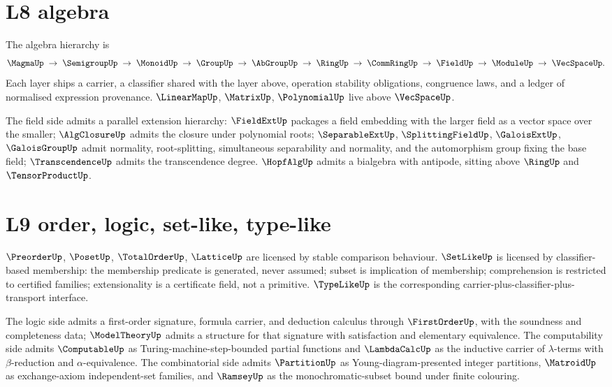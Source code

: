 \section{L8 algebra}
\label{sec:roadmap-l8-algebra}

The algebra hierarchy is
$$
\MagmaUp
\;\to\;
\SemigroupUp
\;\to\;
\MonoidUp
\;\to\;
\GroupUp
\;\to\;
\AbGroupUp
\;\to\;
\RingUp
\;\to\;
\CommRingUp
\;\to\;
\FieldUp
\;\to\;
\ModuleUp
\;\to\;
\VecSpaceUp.
$$
Each layer ships a carrier, a classifier shared with the layer above, operation stability obligations, congruence laws, and a ledger of normalised expression provenance. $\LinearMapUp$, $\MatrixUp$, $\PolynomialUp$ live above $\VecSpaceUp$.

The field side admits a parallel extension hierarchy: $\FieldExtUp$ packages a field embedding with the larger field as a vector space over the smaller; $\AlgClosureUp$ admits the closure under polynomial roots; $\SeparableExtUp$, $\SplittingFieldUp$, $\GaloisExtUp$, $\GaloisGroupUp$ admit normality, root-splitting, simultaneous separability and normality, and the automorphism group fixing the base field; $\TranscendenceUp$ admits the transcendence degree. $\HopfAlgUp$ admits a bialgebra with antipode, sitting above $\RingUp$ and $\TensorProductUp$.

\section{L9 order, logic, set-like, type-like}
\label{sec:roadmap-l9-order-logic-set-type}

$\PreorderUp$, $\PosetUp$, $\TotalOrderUp$, $\LatticeUp$ are licensed by stable comparison behaviour. $\SetLikeUp$ is licensed by classifier-based membership: the membership predicate is generated, never assumed; subset is implication of membership; comprehension is restricted to certified families; extensionality is a certificate field, not a primitive. $\TypeLikeUp$ is the corresponding carrier-plus-classifier-plus-transport interface.

The logic side admits a first-order signature, formula carrier, and deduction calculus through $\FirstOrderUp$, with the soundness and completeness data; $\ModelTheoryUp$ admits a structure for that signature with satisfaction and elementary equivalence. The computability side admits $\ComputableUp$ as Turing-machine-step-bounded partial functions and $\LambdaCalcUp$ as the inductive carrier of $\lambda$-terms with $\beta$-reduction and $\alpha$-equivalence. The combinatorial side admits $\PartitionUp$ as Young-diagram-presented integer partitions, $\MatroidUp$ as exchange-axiom independent-set families, and $\RamseyUp$ as the monochromatic-subset bound under finite colouring.

